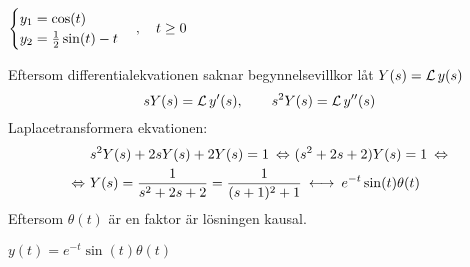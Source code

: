 \begin{task}{5.4}
	\ans 
	$\begin{cases}
	y_1=\cos(t) \\
	y_2=\frac{1}{2}\sin(t)-t
	\end{cases}, \quad t \ge 0$
\end{task}

\begin{task}{5.5}
	Eftersom differentialekvationen saknar begynnelsevillkor låt $Y(s)=\operatorname{\mathcal{L}} y(s)$ 
	\[sY(s)=\operatorname{\mathcal{L}} y'(s),\qquad s^2Y(s)=\operatorname{\mathcal{L}} y''(s)\]
	Laplacetransformera ekvationen:
	\begin{align*}
	&s^2Y(s)+2sY(s)+2Y(s)=1 \lra
	(s^2+2s+2)Y(s)=1\lra \\ \lra
	&Y(s)=\frac{1}{s^2+2s+2}=
	\frac{1}{(s+1)^2+1}\llra
	e^{-t}\sin(t)\theta(t)
	\end{align*}
	Eftersom $\theta(t)$ är en faktor är lösningen kausal.
	
	\ans $y(t)=e^{-t}\sin(t)\theta(t)$
\end{task}
